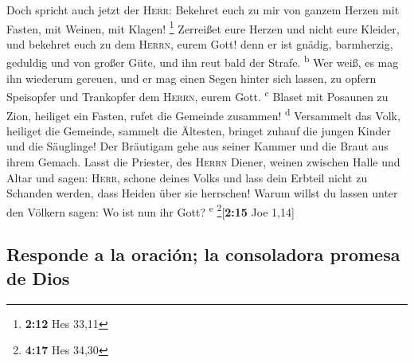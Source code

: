  Doch spricht auch jetzt der \textsc{Herr}: Bekehret euch
zu mir von ganzem Herzen mit Fasten, mit Weinen, mit Klagen! \footnote{\textbf{2:12}
  Hes 33,11}  Zerreißet eure Herzen und nicht eure
Kleider, und bekehret euch zu dem \textsc{Herrn}, eurem Gott! denn er
ist gnädig, barmherzig, geduldig und von großer Güte, und ihn reut bald
der Strafe. \textsuperscript{b}  Wer weiß, es mag ihn
wiederum gereuen, und er mag einen Segen hinter sich lassen, zu opfern
Speisopfer und Trankopfer dem \textsc{Herrn}, eurem Gott.
\textsuperscript{c}  Blaset mit Posaunen zu Zion,
heiliget ein Fasten, rufet die Gemeinde zusammen! \textsuperscript{d}
 Versammelt das Volk, heiliget die Gemeinde, sammelt die
Ältesten, bringet zuhauf die jungen Kinder und die Säuglinge! Der
Bräutigam gehe aus seiner Kammer und die Braut aus ihrem Gemach.
 Lasst die Priester, des \textsc{Herrn} Diener, weinen
zwischen Halle und Altar und sagen: \textsc{Herr}, schone deines Volks
und lass dein Erbteil nicht zu Schanden werden, dass Heiden über sie
herrschen! Warum willst du lassen unter den Völkern sagen: Wo ist nun
ihr Gott? \textsuperscript{e} \footnote{\textbf{4:17} Hes 34,30}{[}\textbf{2:15}
Joe 1,14{]}

\hypertarget{responde-a-la-oraciuxf3n-la-consoladora-promesa-de-dios}{%
\subsection{Responde a la oración; la consoladora promesa de
Dios}\label{responde-a-la-oraciuxf3n-la-consoladora-promesa-de-dios}}

